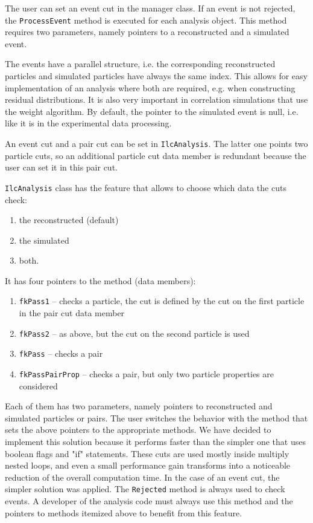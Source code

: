\documentclass[12pt,a4paper,twoside]{article}
\begin{document}
{The user can set an event cut in the manager class.
If an event is not rejected, the \texttt{ProcessEvent}
method is executed for each analysis object. 
This method requires two parameters, namely pointers to 
a reconstructed and a simulated event. 

The events have a parallel structure, i.e. the corresponding
reconstructed particles and simulated particles have always the same index.
This allows for easy implementation of an analysis where both
are required, e.g. when constructing residual distributions.
It is also very important in correlation simulations 
that use the weight algorithm\cite{CH6Ref:Weights}. 
By default, the pointer to the simulated event is null, 
i.e. like it is in the experimental data processing.

An event cut and a pair cut can be set in \texttt{IlcAnalysis}.
The latter one points two particle cuts, so
an additional particle cut data member is redundant
because the user can set it in this pair cut.

\texttt{IlcAnalysis} class has the feature that allows to choose
which data the cuts check:
\begin{enumerate}
\item the reconstructed (default)
\item the simulated 
\item both.
\end{enumerate}
% 
It has four pointers to the  method (data members):
\begin{enumerate}
\item \texttt{fkPass1} -- checks a particle, the cut is defined by the 
  cut on the first particle in the pair cut data member
\item \texttt{fkPass2} -- as above, but the cut on the second particle is used
\item \texttt{fkPass}  -- checks a pair
\item \texttt{fkPassPairProp} -- checks a pair, but only two particle properties
  are considered
\end{enumerate}
Each of them has two parameters, namely pointers to 
reconstructed and simulated particles or pairs.
The user switches the behavior with the
method that sets the above pointers to the appropriate methods. 
We have decided to implement
this solution because it performs faster than the simpler one that uses
boolean flags and "if" statements. These cuts are used mostly inside 
multiply nested loops, and even a small performance gain transforms 
into a noticeable reduction of the overall computation time.
In the case of an event cut, the simpler solution was applied.
The \texttt{Rejected} method is always used to check events.
A developer of the analysis code must always use this method and 
the pointers to methods itemized above to benefit from this feature.

}
\end{document}
